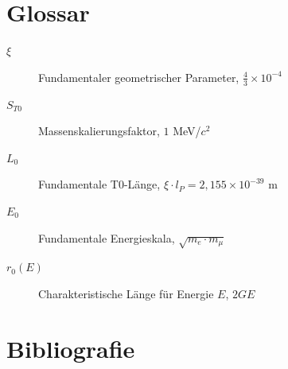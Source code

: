 	\section*{Glossar}
	
	\begin{description}
		\item[$\xi$] Fundamentaler geometrischer Parameter, $\frac{4}{3} \times 10^{-4}$
		\item[$S_{T0}$] Massenskalierungsfaktor, $1$ MeV/$c^2$
		\item[$L_0$] Fundamentale T0-Länge, $\xi \cdot l_P = 2{,}155 \times 10^{-39}$ m
		\item[$E_0$] Fundamentale Energieskala, $\sqrt{m_e \cdot m_\mu}$
		\item[$r_0(E)$] Charakteristische Länge für Energie $E$, $2GE$
	\end{description}
	
	
	
	\section{Bibliografie}
	
